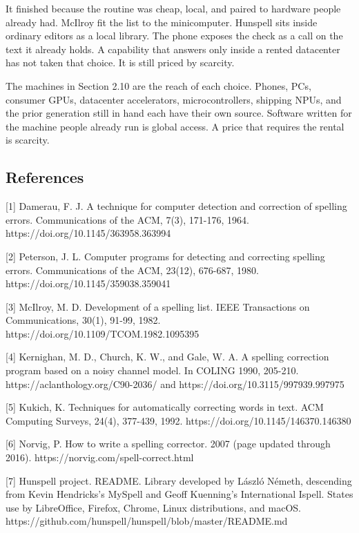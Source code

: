 \documentclass[
  10pt,
]{article}
\begin{document}
It finished because the routine was cheap, local, and paired to hardware
people already had. McIlroy fit the list to the minicomputer. Hunspell
sits inside ordinary editors as a local library. The phone exposes the
check as a call on the text it already holds. A capability that answers
only inside a rented datacenter has not taken that choice. It is still
priced by scarcity.

The machines in Section 2.10 are the reach of each choice. Phones, PCs,
consumer GPUs, datacenter accelerators, microcontrollers, shipping NPUs,
and the prior generation still in hand each have their own source.
Software written for the machine people already run is global access. A
price that requires the rental is scarcity.

\subsection{References}\label{references}

{[}1{]} Damerau, F. J. A technique for computer detection and correction
of spelling errors. Communications of the ACM, 7(3), 171-176, 1964.
https://doi.org/10.1145/363958.363994

{[}2{]} Peterson, J. L. Computer programs for detecting and correcting
spelling errors. Communications of the ACM, 23(12), 676-687, 1980.
https://doi.org/10.1145/359038.359041

{[}3{]} McIlroy, M. D. Development of a spelling list. IEEE Transactions
on Communications, 30(1), 91-99, 1982.
https://doi.org/10.1109/TCOM.1982.1095395

{[}4{]} Kernighan, M. D., Church, K. W., and Gale, W. A. A spelling
correction program based on a noisy channel model. In COLING 1990,
205-210. https://aclanthology.org/C90-2036/ and
https://doi.org/10.3115/997939.997975

{[}5{]} Kukich, K. Techniques for automatically correcting words in
text. ACM Computing Surveys, 24(4), 377-439, 1992.
https://doi.org/10.1145/146370.146380

{[}6{]} Norvig, P. How to write a spelling corrector. 2007 (page updated
through 2016). https://norvig.com/spell-correct.html

{[}7{]} Hunspell project. README. Library developed by László Németh,
descending from Kevin Hendricks's MySpell and Geoff Kuenning's
International Ispell. States use by LibreOffice, Firefox, Chrome, Linux
distributions, and macOS.
https://github.com/hunspell/hunspell/blob/master/README.md
\end{document}
